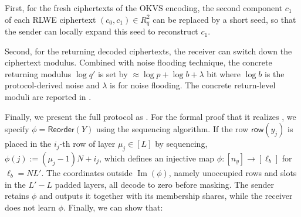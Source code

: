 First, for the fresh ciphertexts of the OKVS encoding, the second component $c_1$ of each RLWE ciphertext $(c_0,c_1) \in R_q^2$ can be replaced by a short seed, so that the sender can locally expand this seed to reconstruct $c_1$.

Second, for the returning decoded ciphertexts, 
the receiver can switch down the ciphertext modulus. Combined with noise flooding technique, the concrete returning modulus $\log q'$ is set by $\approx \log p + \log b + \lambda$ bit where $\log b$ is the protocol-derived noise and $\lambda$ is for noise flooding.
The concrete return-level moduli are reported in .

Finally, we present the full protocol as .
For the formal proof that it realizes , we specify $\phi = \mathsf{Reorder}(Y)$ using the sequencing algorithm. If the row $\mathsf{row}(y_j)$ is placed in the $i_j$-th row of layer $\mu_j\in[L]$ by sequencing, $\phi(j):=(\mu_j-1)N+i_j$, which defines an injective map $\phi:[n_y]\rightarrow[\ell_b]$ for $\ell_b=NL'$. 
The coordinates outside $\operatorname{Im}(\phi)$, namely unoccupied rows and slots in the $L'-L$ padded layers, all decode to zero before masking. The sender retains $\phi$ and outputs it together with its membership shares, while the receiver does not learn $\phi$. Finally, we can show that:

